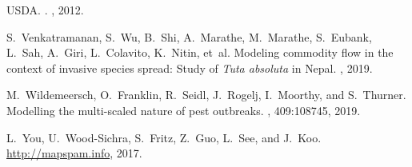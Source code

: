 \documentclass[11pt]{article}
\theoremstyle{definition}
\begin{document}
\begin{thebibliography}{10}
USDA.
.
, 2012.

S.~Venkatramanan, S.~Wu, B.~Shi, A.~Marathe, M.~Marathe, S.~Eubank, L.~Sah,
  A.~Giri, L.~Colavito, K.~Nitin, et~al.
\newblock Modeling commodity flow in the context of invasive species spread:
  Study of \emph{{T}uta absoluta} in {Nepal}.
, 2019.

M.~Wildemeersch, O.~Franklin, R.~Seidl, J.~Rogelj, I.~Moorthy, and S.~Thurner.
\newblock Modelling the multi-scaled nature of pest outbreaks.
, 409:108745, 2019.

L.~You, U.~Wood-Sichra, S.~Fritz, Z.~Guo, L.~See, and J.~Koo.
\newblock \url{http://mapspam.info}, 2017.

\end{thebibliography}
\end{document}
